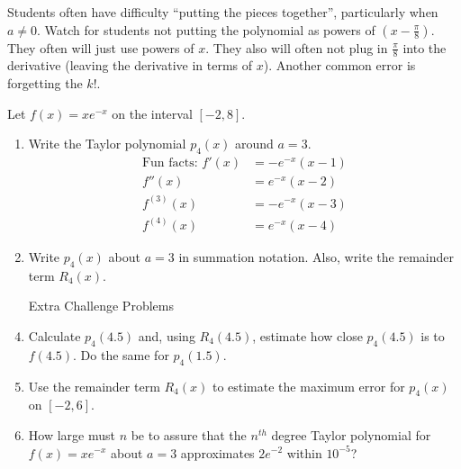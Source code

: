 \documentclass[noinstructornotes]{ximera}
\begin{document}
\begin{instructorNotes}
Students often have difficulty ``putting the pieces together'', particularly when $a \neq 0$.  
Watch for students not putting the polynomial as powers of $\left(x - \frac{\pi}{8} \right)$.  
They often will just use powers of $x$.  
They also will often not plug in $\frac{\pi}{8}$ into the derivative (leaving the derivative in terms of $x$).  
Another common error is forgetting the $k!$.  
\end{instructorNotes}







\begin{problem}
Let $f(x) = xe^{-x}$ on the interval $[-2,8]$.  
	\begin{enumerate}
	
	\item  Write the Taylor polynomial $p_4(x)$ around $a=3$.
		\begin{align*}
		\text{Fun facts: } f'(x) &= -e^{-x}(x-1)  \\
		f''(x) &= e^{-x} (x-2) \\
		f^{(3)}(x) &= -e^{-x} (x-3) \\
		f^{(4)}(x) &= e^{-x} (x-4) 
		\end{align*}
	
	\item  Write $p_4(x)$ about $a=3$ in summation notation.  
	Also, write the remainder term $R_4(x)$.  \\	
	
	\item[Extra Challenge Problems] 
	
	\item Calculate $p_4(4.5)$ and, using $R_4(4.5)$, estimate how close $p_4(4.5)$ is to $f(4.5)$.  
	Do the same for $p_4(1.5)$.  
	
	\item  Use the remainder term $R_4(x)$ to estimate the maximum error for $p_4(x)$ on $[-2,6]$.
	
	\item  How large must $n$ be to assure that the $n^{th}$ degree Taylor polynomial for $f(x) = xe^{-x}$ about $a=3$ approximates $2e^{-2}$ within $10^{-5}$?
	
	\end{enumerate}
	
	\begin{freeResponse}
	\begin{enumerate}
	

\end{enumerate}
\end{freeResponse}
\end{problem}
\end{document}
